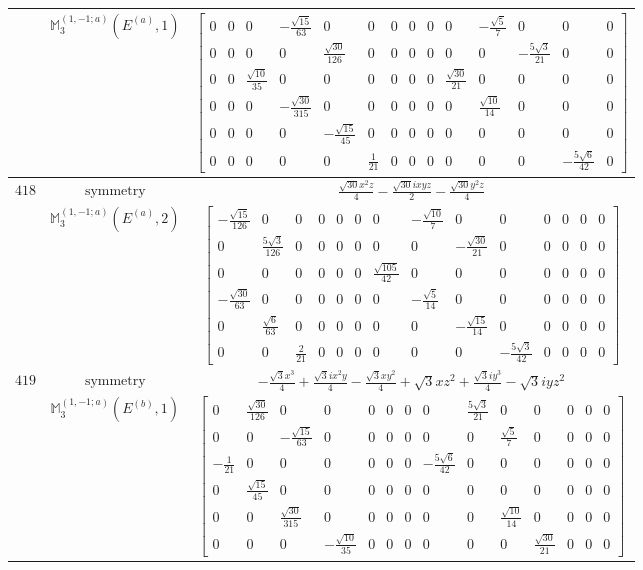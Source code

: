 \documentclass[fleqn,8pt,landscape]{jsarticle}
\begin{document}
\begin{longtable}{ccc}
$  $ & $ \mathbb{M}_{3}^{(1,-1;a)}(E^{(a)},1) $ & $ \begin{bmatrix} 0 & 0 & 0 & - \frac{\sqrt{15}}{63} & 0 & 0 & 0 & 0 & 0 & 0 & - \frac{\sqrt{5}}{7} & 0 & 0 & 0 \\ 0 & 0 & 0 & 0 & \frac{\sqrt{30}}{126} & 0 & 0 & 0 & 0 & 0 & 0 & - \frac{5 \sqrt{3}}{21} & 0 & 0 \\ 0 & 0 & \frac{\sqrt{10}}{35} & 0 & 0 & 0 & 0 & 0 & 0 & \frac{\sqrt{30}}{21} & 0 & 0 & 0 & 0 \\ 0 & 0 & 0 & - \frac{\sqrt{30}}{315} & 0 & 0 & 0 & 0 & 0 & 0 & \frac{\sqrt{10}}{14} & 0 & 0 & 0 \\ 0 & 0 & 0 & 0 & - \frac{\sqrt{15}}{45} & 0 & 0 & 0 & 0 & 0 & 0 & 0 & 0 & 0 \\ 0 & 0 & 0 & 0 & 0 & \frac{1}{21} & 0 & 0 & 0 & 0 & 0 & 0 & - \frac{5 \sqrt{6}}{42} & 0 \end{bmatrix} $ \\ \hline
$ 418 $ & $ \text{symmetry} $ & $ \frac{\sqrt{30} x^{2} z}{4} - \frac{\sqrt{30} i x y z}{2} - \frac{\sqrt{30} y^{2} z}{4} $ \\
$  $ & $ \mathbb{M}_{3}^{(1,-1;a)}(E^{(a)},2) $ & $ \begin{bmatrix} - \frac{\sqrt{15}}{126} & 0 & 0 & 0 & 0 & 0 & 0 & - \frac{\sqrt{10}}{7} & 0 & 0 & 0 & 0 & 0 & 0 \\ 0 & \frac{5 \sqrt{3}}{126} & 0 & 0 & 0 & 0 & 0 & 0 & - \frac{\sqrt{30}}{21} & 0 & 0 & 0 & 0 & 0 \\ 0 & 0 & 0 & 0 & 0 & 0 & \frac{\sqrt{105}}{42} & 0 & 0 & 0 & 0 & 0 & 0 & 0 \\ - \frac{\sqrt{30}}{63} & 0 & 0 & 0 & 0 & 0 & 0 & - \frac{\sqrt{5}}{14} & 0 & 0 & 0 & 0 & 0 & 0 \\ 0 & \frac{\sqrt{6}}{63} & 0 & 0 & 0 & 0 & 0 & 0 & - \frac{\sqrt{15}}{14} & 0 & 0 & 0 & 0 & 0 \\ 0 & 0 & \frac{2}{21} & 0 & 0 & 0 & 0 & 0 & 0 & - \frac{5 \sqrt{3}}{42} & 0 & 0 & 0 & 0 \end{bmatrix} $ \\ \hline
$ 419 $ & $ \text{symmetry} $ & $ - \frac{\sqrt{3} x^{3}}{4} + \frac{\sqrt{3} i x^{2} y}{4} - \frac{\sqrt{3} x y^{2}}{4} + \sqrt{3} x z^{2} + \frac{\sqrt{3} i y^{3}}{4} - \sqrt{3} i y z^{2} $ \\
$  $ & $ \mathbb{M}_{3}^{(1,-1;a)}(E^{(b)},1) $ & $ \begin{bmatrix} 0 & \frac{\sqrt{30}}{126} & 0 & 0 & 0 & 0 & 0 & 0 & \frac{5 \sqrt{3}}{21} & 0 & 0 & 0 & 0 & 0 \\ 0 & 0 & - \frac{\sqrt{15}}{63} & 0 & 0 & 0 & 0 & 0 & 0 & \frac{\sqrt{5}}{7} & 0 & 0 & 0 & 0 \\ - \frac{1}{21} & 0 & 0 & 0 & 0 & 0 & 0 & - \frac{5 \sqrt{6}}{42} & 0 & 0 & 0 & 0 & 0 & 0 \\ 0 & \frac{\sqrt{15}}{45} & 0 & 0 & 0 & 0 & 0 & 0 & 0 & 0 & 0 & 0 & 0 & 0 \\ 0 & 0 & \frac{\sqrt{30}}{315} & 0 & 0 & 0 & 0 & 0 & 0 & \frac{\sqrt{10}}{14} & 0 & 0 & 0 & 0 \\ 0 & 0 & 0 & - \frac{\sqrt{10}}{35} & 0 & 0 & 0 & 0 & 0 & 0 & \frac{\sqrt{30}}{21} & 0 & 0 & 0 \end{bmatrix} $ \\ \hline

\end{longtable}
\end{document}

